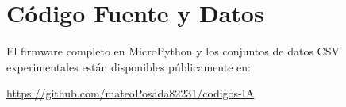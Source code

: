 \documentclass[conference]{IEEEtran}
\begin{document}
\appendix
\section{Código Fuente y Datos}
\label{sec:appendix}

El firmware completo en MicroPython y los conjuntos de datos CSV experimentales están disponibles públicamente en:

\begin{center}
\url{https://github.com/mateoPosada82231/codigos-IA}
\end{center}

\end{document}
